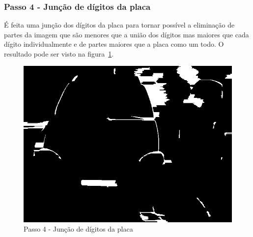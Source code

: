 \documentclass[11pt]{article} %
\begin{document}
\subsubsection{Passo 4 - Junção de dígitos da placa}
	É feita uma junção dos dígitos da placa para tornar possível a eliminação de partes da imagem que são menores que a união dos dígitos mas maiores que cada dígito individualmente e de partes maiores que a placa como um todo. O resultado pode ser visto na figura~\ref{step3}.
	\begin{figure}[!h]
		\begin{center}
		\includegraphics[scale=0.5]{img_relatorio/step3.png}
		\caption{Passo 4 - Junção de dígitos da placa}\label{step3}
		\end{center}
	\end{figure}
\newpage
\end{document}

